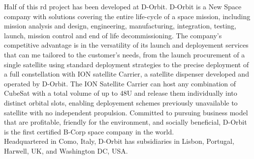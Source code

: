 Half of this \acrshort{rd} project has been developed at D-Orbit. D-Orbit is a New Space company with solutions covering the entire life-cycle of a space mission, including mission analysis and design, engineering, manufacturing, integration, testing, launch, mission control and end of life decommissioning. The company's competitive advantage is in the versatility of its launch and deployement services that can me tailored to the customer's needs, from the launch procurement of a single satellite using standard deployment strategies to the precise deployment of a full constellation with ION satellite Carrier, a satellite dispenser developed and operated by D-Orbit. The ION Satellite Carrier can host any combination of CubeSat with a total volume of up to 48U and release them individually into distinct orbital slots, enabling deployement schemes previously unavailable to satellite with no independent propulsion. Committed to pursuing business model that are profitable, friendly for the environment, and socially beneficial, D-Orbit is the first certified B-Corp space company in the world.\\
Headquartered in Como, Italy, D-Orbit has subsidiaries in Lisbon, Portugal, Harwell, UK, and Washington DC, USA.